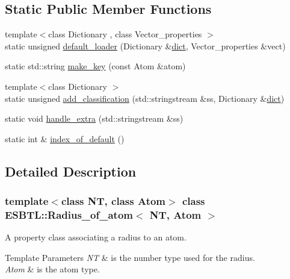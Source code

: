 \subsection*{Static Public Member Functions}
\begin{DoxyCompactItemize}
\item 
{\footnotesize template$<$class Dictionary , class Vector\+\_\+properties $>$ }\\static unsigned \hyperlink{classESBTL_1_1Radius__of__atom_a9693cfa24cf0a5a05149c17245b20c7f}{default\+\_\+loader} (Dictionary \&\hyperlink{Tsai__jmb__99__radii_8h_a3175002a2df717ae9e433cd2210fea97}{dict}, Vector\+\_\+properties \&vect)
\item 
static std\+::string \hyperlink{classESBTL_1_1Radius__of__atom_a97a8af8d7d49ffd8ba51819edeed37ef}{make\+\_\+key} (const Atom \&atom)
\item 
{\footnotesize template$<$class Dictionary $>$ }\\static unsigned \hyperlink{classESBTL_1_1Radius__of__atom_a17d41d6fcf8a0ffb4a3568c51ee96b68}{add\+\_\+classification} (std\+::stringstream \&ss, Dictionary \&\hyperlink{Tsai__jmb__99__radii_8h_a3175002a2df717ae9e433cd2210fea97}{dict})
\item 
static void \hyperlink{classESBTL_1_1Radius__of__atom_a0b50c09fef4c70675661c4a35e4a23f1}{handle\+\_\+extra} (std\+::stringstream \&ss)
\item 
static int \& \hyperlink{classESBTL_1_1Radius__of__atom_a017cf5493434a9cc5030078140571b1a}{index\+\_\+of\+\_\+default} ()
\end{DoxyCompactItemize}


\subsection{Detailed Description}
\subsubsection*{template$<$class NT, class Atom$>$\newline
class E\+S\+B\+T\+L\+::\+Radius\+\_\+of\+\_\+atom$<$ N\+T, Atom $>$}

A property class associating a radius to an atom. 
\begin{DoxyTemplParams}{Template Parameters}
{\em NT} & is the number type used for the radius. \\
\hline
{\em Atom} & is the atom type. \\
\hline
\end{DoxyTemplParams}


